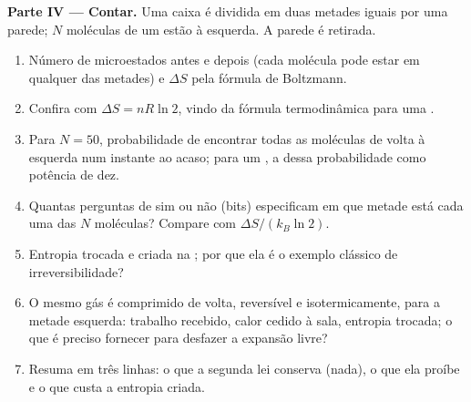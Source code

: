 \begin{problem}
\medskip
\noindent\textbf{Parte IV --- Contar.}
Uma caixa é dividida em duas metades iguais por uma parede; $N$ moléculas
de um  estão à esquerda. A parede é retirada.
\begin{enumerate}[resume]
  \item Número de microestados antes e depois (cada molécula pode estar em
        qualquer das metades) e $\Delta S$ pela fórmula de Boltzmann.
  \item Confira com $\Delta S = nR\ln2$, vindo da fórmula termodinâmica
        para uma .
  \item Para $N = 50$, probabilidade de encontrar todas as moléculas de
        volta à esquerda num instante ao acaso; para um , a  dessa probabilidade como potência de dez.
  \item Quantas perguntas de sim ou não (bits) especificam em que metade
        está cada uma das $N$ moléculas? Compare com $\Delta S/(k_B\ln2)$.
  \item Entropia trocada e criada na ; por que ela é o
        exemplo clássico de irreversibilidade?
  \item O mesmo gás é comprimido de volta, reversível e isotermicamente,
        para a metade esquerda: trabalho recebido, calor cedido à sala,
        entropia trocada; o que é preciso fornecer para desfazer a
        expansão livre?
  \item Resuma em três linhas: o que a segunda lei conserva (nada), o que
        ela proíbe e o que custa a entropia criada.
\end{enumerate}
\end{problem}
